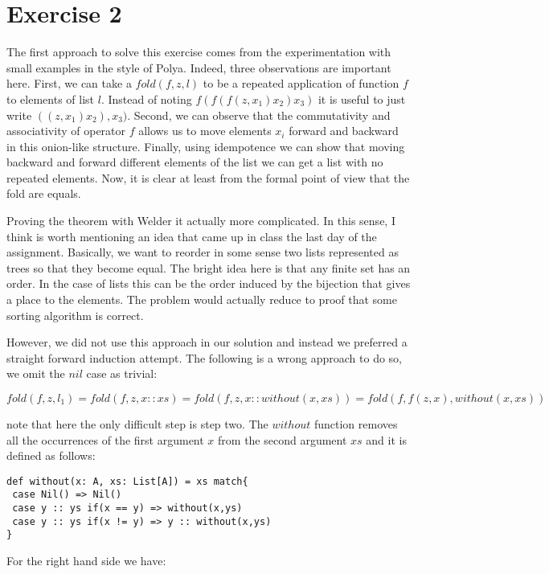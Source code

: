 \documentclass{article}
\begin{document}
\section*{Exercise 2}

The first approach to solve this exercise comes from the experimentation with small examples in the style of Polya. Indeed, three observations are important here. First, we can take a $fold(f,z,l)$ to be a repeated application of function $f$ to elements of list $l$. Instead of noting $f(f(f(z,x_1)x_2)x_3)$ it is useful to just write $((z,x_1)x_2),x_3)$. Second, we can observe that the commutativity and associativity of operator $f$ allows us to move elements $x_i$ forward and backward in this onion-like structure. Finally, using idempotence we can show that moving backward and forward different elements of the list we can get a list with no repeated elements. Now, it is clear at least from the formal point of view that the fold are equals. 

Proving the theorem with Welder it actually more complicated. In this sense, I think is worth mentioning an idea that came up in class the last day of the assignment. Basically, we want to reorder in some sense two lists represented as trees so that they become equal. The bright idea here is that any finite set has an order. In the case of lists this can be the order induced by the bijection that gives a place to the elements. The problem would actually reduce to proof that some sorting algorithm is correct. 

However, we did not use this approach in our solution and instead we preferred a straight forward induction attempt. The following is a wrong approach to do so, we omit the $nil$ case as trivial:

$$fold(f,z,l_1) = fold(f,z,x::xs) = fold(f,z,x::without(x,xs)) = fold(f,f(z,x),without(x,xs))$$

note that here the only difficult step is step two. The $without$ function removes all the occurrences of the first argument $x$ from the second argument $xs$ and it is defined as follows:

\begin{lstlisting}[label={list:first},caption=Scala code for the without function]
def without(x: A, xs: List[A]) = xs match{
 case Nil() => Nil()
 case y :: ys if(x == y) => without(x,ys)
 case y :: ys if(x != y) => y :: without(x,ys)  
}
\end{lstlisting} 

For the right hand side we have:
\end{document}
